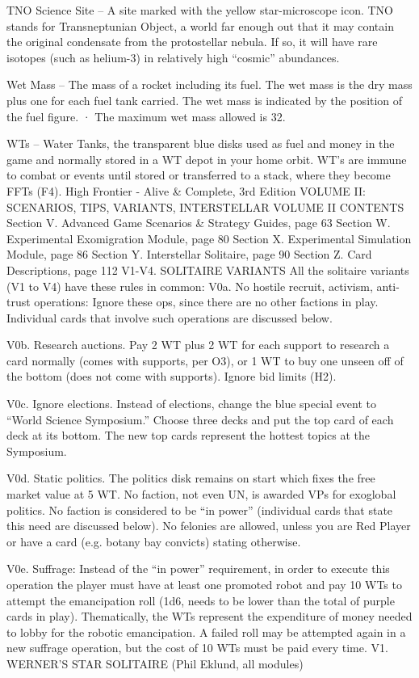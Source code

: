 \documentclass[a4paper]{book}
\begin{document}
TNO Science Site – A site marked with the yellow star-microscope icon. TNO stands for Transneptunian Object, a world far enough out that it may contain the original condensate from the protostellar nebula. If so, it will have rare isotopes (such as helium-3) in relatively high “cosmic” abundances.

Wet Mass – The mass of a rocket including its fuel. The wet mass is the dry mass plus one for each fuel tank carried. The wet mass is indicated by the position of the fuel figure.
·   	The maximum wet mass allowed is 32.

WTs – Water Tanks, the transparent blue disks used as fuel and money in the game and normally stored in a WT depot in your home orbit. WT’s are immune to combat or events until stored or transferred to a stack, where they become FFTs (F4). 
High Frontier - Alive \& Complete, 3rd Edition
VOLUME II: SCENARIOS, TIPS, VARIANTS, INTERSTELLAR
VOLUME II CONTENTS
Section V. Advanced Game Scenarios \& Strategy Guides, page 63
Section W. Experimental Exomigration Module, page 80
Section X. Experimental Simulation Module, page 86
Section Y. Interstellar Solitaire, page 90
Section Z. Card Descriptions, page 112
V1-V4. SOLITAIRE VARIANTS
All the solitaire variants (V1 to V4) have these rules in common:
V0a. No hostile recruit, activism, anti-trust operations: Ignore these ops, since there are no other factions in play. Individual cards that involve such operations are discussed below.

V0b. Research auctions. Pay 2 WT plus 2 WT for each support to research a card normally (comes with supports, per O3), or 1 WT to buy one unseen off of the bottom (does not come with supports). Ignore bid limits (H2).

V0c. Ignore elections. Instead of elections, change the blue special event to “World Science Symposium.” Choose three decks and put the top card of each deck at its bottom. The new top cards represent the hottest topics at the Symposium. 

V0d. Static politics. The politics disk remains on start which fixes the free market value at 5 WT. No faction, not even UN, is awarded VPs for exoglobal politics. No faction is considered to be “in power” (individual cards that state this need are discussed below). No felonies are allowed, unless you are Red Player or have a card (e.g. botany bay convicts) stating otherwise.

V0e. Suffrage: Instead of the “in power” requirement, in order to execute this operation the player must have at least one promoted robot and pay 10 WTs to attempt the emancipation roll (1d6, needs to be lower than the total of purple cards in play). Thematically, the WTs represent the expenditure of money needed to lobby for the robotic emancipation. A failed roll may be attempted again in a new suffrage operation, but the cost of 10 WTs must be paid every time.
V1. WERNER’S STAR SOLITAIRE (Phil Eklund, all modules)
 
\end{document}
